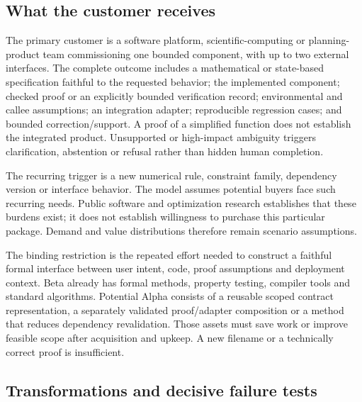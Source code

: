 \documentclass[11pt,letterpaper]{article}
\begin{document}
\subsection{What the customer receives}

The primary customer is a software platform, scientific-computing or planning-product team commissioning one bounded component, with up to two external interfaces. The complete outcome includes a mathematical or state-based specification faithful to the requested behavior; the implemented component; checked proof or an explicitly bounded verification record; environmental and callee assumptions; an integration adapter; reproducible regression cases; and bounded correction/support. A proof of a simplified function does not establish the integrated product. Unsupported or high-impact ambiguity triggers clarification, abstention or refusal rather than hidden human completion.

The recurring trigger is a new numerical rule, constraint family, dependency version or interface behavior. The model assumes potential buyers face such recurring needs. Public software and optimization research establishes that these burdens exist; it does not establish willingness to purchase this particular package. Demand and value distributions therefore remain scenario assumptions.

The binding restriction is the repeated effort needed to construct a faithful formal interface between user intent, code, proof assumptions and deployment context. Beta already has formal methods, property testing, compiler tools and standard algorithms. Potential Alpha consists of a reusable scoped contract representation, a separately validated proof/adapter composition or a method that reduces dependency revalidation. Those assets must save work or improve feasible scope after acquisition and upkeep. A new filename or a technically correct proof is insufficient.

\subsection{Transformations and decisive failure tests}
\end{document}

